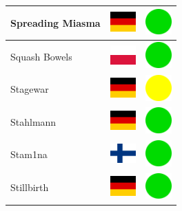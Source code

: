 \documentclass[12pt, a4paper, twoside]{report}
\begin{document}
\begin{center}
\begin{longtable}{|p{5cm}|p{2cm}|p{2cm}|}
 Spreading Miasma                                           & \includegraphics[width=1cm]{4x3/de} &   \includegraphics[width=1cm]{likes/y} \\ \hline
 Squash Bowels                                              & \includegraphics[width=1cm]{4x3/pl} &   \includegraphics[width=1cm]{likes/y} \\ \hline
 Stagewar                                                   & \includegraphics[width=1cm]{4x3/de} &   \includegraphics[width=1cm]{likes/m} \\ \hline
 Stahlmann                                                  & \includegraphics[width=1cm]{4x3/de} &   \includegraphics[width=1cm]{likes/y} \\ \hline
 Stam1na                                                    & \includegraphics[width=1cm]{4x3/fi} &   \includegraphics[width=1cm]{likes/y} \\ \hline
 Stillbirth                                                 & \includegraphics[width=1cm]{4x3/de} &   \includegraphics[width=1cm]{likes/y} \\ \hline

\end{longtable}
\end{center}
\end{document}
